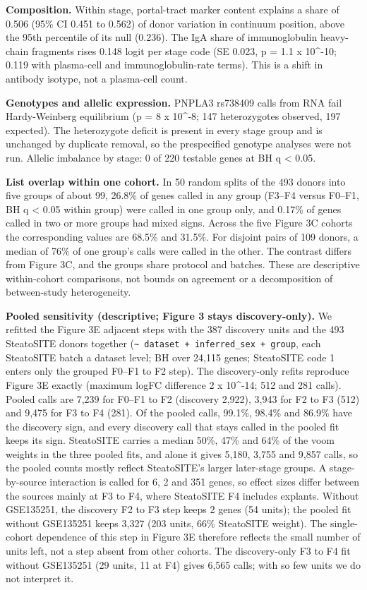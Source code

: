 \textbf{Composition.} Within stage, portal-tract marker content explains a share of 0.506 (95\% CI 0.451 to 0.562) of donor variation in continuum position, above the 95th percentile of its null (0.236). The IgA share of immunoglobulin heavy-chain fragments rises 0.148 logit per stage code (SE 0.023, p = 1.1 x 10\^{}-10; 0.119 with plasma-cell and immunoglobulin-rate terms). This is a shift in antibody isotype, not a plasma-cell count.

\textbf{Genotypes and allelic expression.} PNPLA3 rs738409 calls from RNA fail Hardy-Weinberg equilibrium (p = 8 x 10\^{}-8; 147 heterozygotes observed, 197 expected). The heterozygote deficit is present in every stage group and is unchanged by duplicate removal, so the prespecified genotype analyses were not run. Allelic imbalance by stage: 0 of 220 testable genes at BH q \textless{} 0.05.

\textbf{List overlap within one cohort.} In 50 random splits of the 493 donors into five groups of about 99, 26.8\% of genes called in any group (F3--F4 versus F0--F1, BH q \textless{} 0.05 within group) were called in one group only, and 0.17\% of genes called in two or more groups had mixed signs. Across the five Figure 3C cohorts the corresponding values are 68.5\% and 31.5\%. For disjoint pairs of 109 donors, a median of 76\% of one group's calls were called in the other. The contrast differs from Figure 3C, and the groups share protocol and batches. These are descriptive within-cohort comparisons, not bounds on agreement or a decomposition of between-study heterogeneity.

\textbf{Pooled sensitivity (descriptive; Figure 3 stays discovery-only).} We refitted the Figure 3E adjacent steps with the 387 discovery units and the 493 SteatoSITE donors together (\texttt{\textasciitilde{}\ dataset\ +\ inferred\_\allowbreak{}sex\ +\ group}, each SteatoSITE batch a dataset level; BH over 24,115 genes; SteatoSITE code 1 enters only the grouped F0--F1 to F2 step). The discovery-only refits reproduce Figure 3E exactly (maximum logFC difference 2 x 10\^{}-14; 512 and 281 calls). Pooled calls are 7,239 for F0--F1 to F2 (discovery 2,922), 3,943 for F2 to F3 (512) and 9,475 for F3 to F4 (281). Of the pooled calls, 99.1\%, 98.4\% and 86.9\% have the discovery sign, and every discovery call that stays called in the pooled fit keeps its sign. SteatoSITE carries a median 50\%, 47\% and 64\% of the voom weights in the three pooled fits, and alone it gives 5,180, 3,755 and 9,857 calls, so the pooled counts mostly reflect SteatoSITE's larger later-stage groups. A stage-by-source interaction is called for 6, 2 and 351 genes, so effect sizes differ between the sources mainly at F3 to F4, where SteatoSITE F4 includes explants. Without GSE135251, the discovery F2 to F3 step keeps 2 genes (54 units); the pooled fit without GSE135251 keeps 3,327 (203 units, 66\% SteatoSITE weight). The single-cohort dependence of this step in Figure 3E therefore reflects the small number of units left, not a step absent from other cohorts. The discovery-only F3 to F4 fit without GSE135251 (29 units, 11 at F4) gives 6,565 calls; with so few units we do not interpret it.

